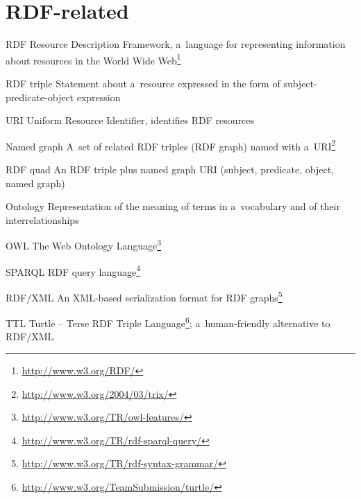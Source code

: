 \section*{RDF-related}
\begin{glossarylist}
	\item[RDF] Resource Description Framework, a~language for representing information about resources in the World Wide Web\footnote{\url{http://www.w3.org/RDF/}}
	\item[RDF triple] Statement about a~resource expressed in the form of subject-predicate-object expression
	\item[URI] Uniform Resource Identifier, identifies RDF resources
	\item[Named graph] A~set of related RDF triples (RDF graph) named with a~URI\footnote{\url{http://www.w3.org/2004/03/trix/}}
	\item[RDF quad] An RDF triple plus named graph URI (subject, predicate, object, named graph)
	\item[Ontology] Representation of the meaning of terms in a~vocabulary and of their interrelationships
	\item[OWL] The Web Ontology Language\footnote{\url{http://www.w3.org/TR/owl-features/}}
	\item[SPARQL] RDF query language\footnote{\url{http://www.w3.org/TR/rdf-sparql-query/}}
	\item[RDF/XML] An XML-based serialization format for RDF graphs\footnote{\url{http://www.w3.org/TR/rdf-syntax-grammar/}}
	\item[TTL] Turtle -- Terse RDF Triple Language\footnote{\url{http://www.w3.org/TeamSubmission/turtle/}}; a~human-friendly alternative to RDF/XML 
\end{glossarylist}

